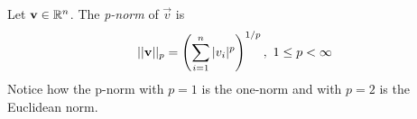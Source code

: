 \begin{example}
    Let $\mathbf{v} \in \mathbb{R}^n$. The \textit{p-norm} of $\vec{v}$ is
    $$ ||\mathbf{v}||_p = \left( \sum_{i=1}^{n}{|v_i|^p} \right)^{1/p},\ 1 \leq p < \infty $$
    Notice how the p-norm with $p = 1$ is the one-norm and with $p = 2$ is the Euclidean norm.
\end{example}